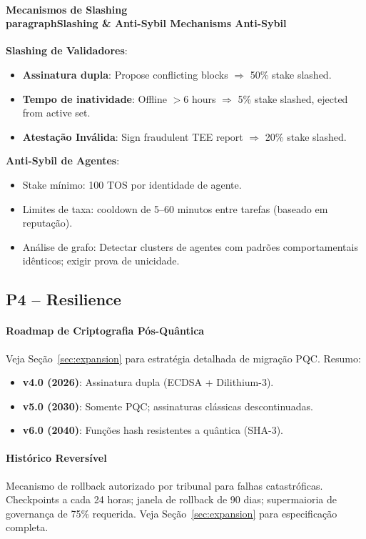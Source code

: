 \documentclass[11pt]{article}
\begin{document}
\begin{itemize}[noitemsep]
\begin{itemize}[noitemsep]
\begin{itemize}[noitemsep]
\paragraph{Mecanismos de Slashing \\paragraph{Slashing \& Anti-Sybil Mechanisms} Anti-Sybil}
\textbf{Slashing de Validadores}:
\begin{itemize}[noitemsep]
  \item \textbf{Assinatura dupla}: Propose conflicting blocks $\Rightarrow$ 50\% stake slashed.
  \item \textbf{Tempo de inatividade}: Offline $>$6 hours $\Rightarrow$ 5\% stake slashed, ejected from active set.
  \item \textbf{Atestação Inválida}: Sign fraudulent TEE report $\Rightarrow$ 20\% stake slashed.
\end{itemize}

\textbf{Anti-Sybil de Agentes}:
\begin{itemize}[noitemsep]
  \item Stake mínimo: 100 TOS por identidade de agente.
  \item Limites de taxa: cooldown de 5--60 minutos entre tarefas (baseado em reputação).
  \item Análise de grafo: Detectar clusters de agentes com padrões comportamentais idênticos; exigir prova de unicidade.
\end{itemize}

\subsection{P4 -- Resilience}
\label{sec:pillar-resilience}

\paragraph{Roadmap de Criptografia Pós-Quântica}
Veja Seção~\ref{sec:expansion} para estratégia detalhada de migração PQC. Resumo:
\begin{itemize}[noitemsep]
  \item \textbf{v4.0 (2026)}: Assinatura dupla (ECDSA + Dilithium-3).
  \item \textbf{v5.0 (2030)}: Somente PQC; assinaturas clássicas descontinuadas.
  \item \textbf{v6.0 (2040)}: Funções hash resistentes a quântica (SHA-3).
\end{itemize}

\paragraph{Histórico Reversível}
Mecanismo de rollback autorizado por tribunal para falhas catastróficas. Checkpoints a cada 24 horas; janela de rollback de 90 dias; supermaioria de governança de 75\% requerida. Veja Seção~\ref{sec:expansion} para especificação completa.


\end{itemize}
\end{itemize}
\end{itemize}
\end{document}
